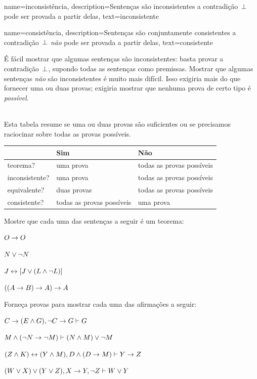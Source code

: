 {    name={inconsist\^encia},
  description={Senten\c{c}as s\~{a}o inconsistentes \ifeff{} a contradi\c{c}\~{a}o~$\bot$ pode ser provada a partir delas},
    text={inconsistente}
}

{    name={consist\^encia},
  description={Senten\c{c}as s\~{a}o conjuntamente consistentes \ifeff{} a contradi\c{c}\~{a}o~$\bot$ \emph{n\~{a}o} pode ser provada a partir delas},
    text={consistente}
}

É fácil mostrar que algumas sentenças são inconsistentes: basta
provar a contradição~$\bot$, supondo todas as sentenças como
premissas. Mostrar que algumas sentenças \emph{não} são inconsistentes é muito
mais difícil. Isso exigiria mais do que fornecer uma ou duas provas;
exigiria mostrar que nenhuma prova de certo tipo é
\emph{possível}.

\
\\
Esta tabela resume se uma ou duas provas são suficientes ou se precisamos raciocinar sobre todas as provas possíveis.

\begin{center}
\begin{tabular}{l l l}
 & \textbf{Sim} & \textbf{Não}\\
 \hline
teorema? & uma prova & todas as provas possíveis\\
inconsistente? & uma prova & todas as provas possíveis\\
equivalente? & duas provas & todas as provas possíveis\\
consistente? & todas as provas possíveis & uma prova\\
\end{tabular}
\end{center}


\practiceproblems
\problempart
Mostre que cada uma das sentenças a seguir é um teorema:
\begin{compactlist}
\item $O \rightarrow O$
\item $N \vee \neg N$
\item $J \leftrightarrow [J\vee (L\wedge\neg L)]$
\item $((A \rightarrow B) \rightarrow A) \rightarrow A$ 
\end{compactlist}

\problempart
Forneça provas para mostrar cada uma das afirmações a seguir:
\begin{compactlist}
\item $C\rightarrow(E\wedge G), \neg C \rightarrow G \vdash G$
\item $M \wedge (\neg N \rightarrow \neg M) \vdash (N \wedge M) \vee \neg M$
\item $(Z\wedge K)\leftrightarrow(Y\wedge M), D\wedge(D\rightarrow M) \vdash Y\rightarrow Z$
\item $(W \vee X) \vee (Y \vee Z), X\rightarrow Y, \neg Z \vdash W\vee Y$
\end{compactlist}

